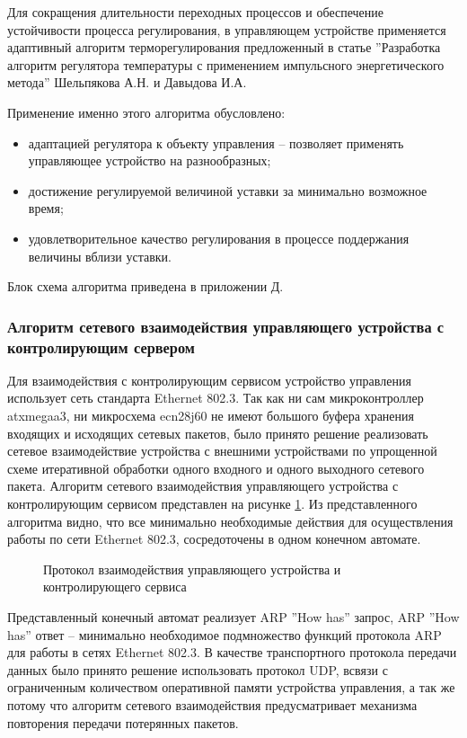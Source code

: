 Для сокращения длительности переходных процессов и обеспечение устойчивости процесса регулирования,
в управляющем устройстве применяется адаптивный алгоритм терморегулирования предложенный в
статье ''Разработка алгоритм регулятора температуры с применением импульсного энергетического метода''
Шельпякова А.Н. и Давыдова И.А.

Применение именно этого алгоритма обусловлено:
\begin{itemize}
	\item адаптацией регулятора к объекту управления -- позволяет применять управляющее устройство
		на разнообразных;
	\item достижение регулируемой величиной уставки за минимально возможное время;
	\item удовлетворительное качество регулирования в процессе поддержания величины вблизи уставки.
\end{itemize}

Блок схема алгоритма приведена в приложении Д.


\subsubsection{Алгоритм сетевого взаимодействия управляющего устройства
с контролирующим сервером}
Для взаимодействия с контролирующим сервисом устройство управления использует сеть
стандарта Ethernet 802.3. Так как ни сам микроконтроллер at\-x\-mega\-a3, ни микросхема
ecn28j60 не имеют большого буфера хранения входящих и исходящих сетевых пакетов,
было принято решение реализовать сетевое взаимодействие устройства с внешними устройствами
по упрощенной схеме итеративной обработки одного входного и одного выходного сетевого
пакета. Алгоритм сетевого взаимодействия управляющего устройства с контролирующим сервисом представлен
на рисунке \ref{img:devProto}. Из представленного алгоритма видно, что все минимально необходимые
действия для осуществления работы по сети Ethernet 802.3, сосредоточены в одном конечном автомате.

\begin{figure}[ht]
	\caption{Протокол взаимодействия управляющего устройства и контролирующего сервиса}
	\label{img:devProto}
\end{figure}

Представленный конечный автомат реализует ARP ''How has'' запрос, ARP ''How has'' ответ --
минимально необходимое подмножество функций протокола ARP для работы в сетях Ethernet 802.3.
В качестве транспортного протокола передачи данных было принято решение использовать
протокол UDP, всвязи с ограниченным количеством оперативной памяти устройства управления, а так же
потому что алгоритм сетевого взаимодействия  предусматривает механизма повторения передачи
потерянных пакетов.


